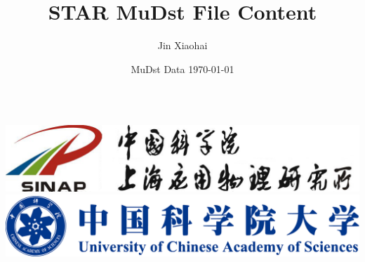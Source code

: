 \documentclass[10pt]{beamer}
\newcommand{\meeting}{MuDst Data}
\begin{document}
\title{\color{black}STAR MuDst File Content}
\author{Jin Xiaohai}
\date{\meeting \hspace{4mm} \today}

\begin{frame}[plain]
  \maketitle
  \begin{columns}[c]
    \includegraphics[width=\textwidth]{image/sinap.jpg}
    \includegraphics[width=\textwidth]{image/ucas.eps}
  \end{columns}
\end{frame}
\end{document}
